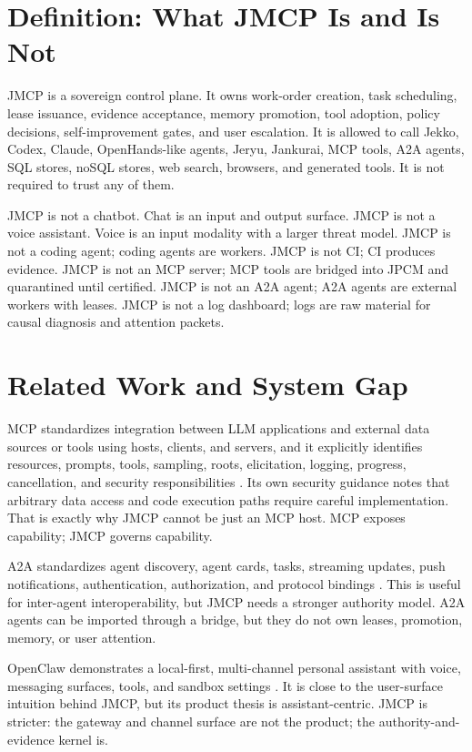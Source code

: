 \documentclass[journal,onecolumn]{IEEEtran}
\begin{document}
\section{Definition: What JMCP Is and Is Not}
JMCP is a sovereign control plane. It owns work-order creation, task scheduling, lease issuance, evidence acceptance, memory promotion, tool adoption, policy decisions, self-improvement gates, and user escalation. It is allowed to call Jekko, Codex, Claude, OpenHands-like agents, Jeryu, Jankurai, MCP tools, A2A agents, SQL stores, noSQL stores, web search, browsers, and generated tools. It is not required to trust any of them.

JMCP is not a chatbot. Chat is an input and output surface. JMCP is not a voice assistant. Voice is an input modality with a larger threat model. JMCP is not a coding agent; coding agents are workers. JMCP is not CI; CI produces evidence. JMCP is not an MCP server; MCP tools are bridged into JPCM and quarantined until certified. JMCP is not an A2A agent; A2A agents are external workers with leases. JMCP is not a log dashboard; logs are raw material for causal diagnosis and attention packets.

\section{Related Work and System Gap}
MCP standardizes integration between LLM applications and external data sources or tools using hosts, clients, and servers, and it explicitly identifies resources, prompts, tools, sampling, roots, elicitation, logging, progress, cancellation, and security responsibilities \cite{mcp}. Its own security guidance notes that arbitrary data access and code execution paths require careful implementation. That is exactly why JMCP cannot be just an MCP host. MCP exposes capability; JMCP governs capability.

A2A standardizes agent discovery, agent cards, tasks, streaming updates, push notifications, authentication, authorization, and protocol bindings \cite{a2a}. This is useful for inter-agent interoperability, but JMCP needs a stronger authority model. A2A agents can be imported through a bridge, but they do not own leases, promotion, memory, or user attention.

OpenClaw demonstrates a local-first, multi-channel personal assistant with voice, messaging surfaces, tools, and sandbox settings \cite{openclaw}. It is close to the user-surface intuition behind JMCP, but its product thesis is assistant-centric. JMCP is stricter: the gateway and channel surface are not the product; the authority-and-evidence kernel is.
\end{document}
